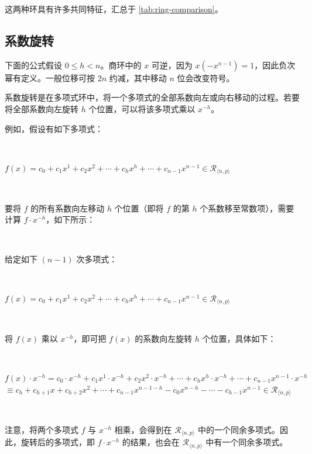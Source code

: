 这两种环具有许多共同特征，汇总于 \autoref{tab:ring-comparison}。


\subsection{系数旋转}
\label{subsec:coeff-rotation}

下面的公式假设 $0\le h<n$。商环中的 $x$ 可逆，因为 $x(-x^{n-1})=1$，因此负次幂有定义。一般位移可按 $2n$ 约减，其中移动 $n$ 位会改变符号。

系数旋转是在多项式环中，将一个多项式的全部系数向左或向右移动的过程。若要将全部系数向左旋转 $h$ 个位置，可以将该多项式乘以 $x^{-h}$。

例如，假设有如下多项式：

$ $

$f(x) = c_0 + c_1x^1 + c_2x^2 + \cdots + c_hx^h + \cdots + c_{n-1}x^{n-1} \in \mathcal{R}_{\langle n, p \rangle}$

$ $

要将 $f$ 的所有系数向左移动 $h$ 个位置（即将 $f$ 的第 $h$ 个系数移至常数项），需要计算 $f \cdot x^{-h}$，如下所示：

$ $

\begin{tcolorbox}[title={\textbf{\tboxlabel{\ref*{subsec:coeff-rotation}} 多项式旋转}}]

给定如下 $(n-1)$ 次多项式：

$ $

$f(x) = c_0 + c_1x^1 + c_2x^2 + \cdots + c_hx^h + \cdots + c_{n-1}x^{n-1} \in \mathcal{R}_{\langle n, p \rangle}$

$ $

将 $f(x)$ 乘以 $x^{-h}$，即可把 $f(x)$ 的系数向左旋转 $h$ 个位置，具体如下：

$ $

$f(x) \cdot x^{-h} = c_0\cdot x^{-h} + c_1x^1 \cdot x^{-h} + c_2x^2 \cdot x^{-h} + \cdots + c_hx^h \cdot x^{-h} + \cdots + c_{n-1}x^{n-1} \cdot x^{-h}$
$\equiv c_h + c_{h+1}x + c_{h+2}x^2 + \cdots + c_{n-1}x^{n-1-h} - c_0x^{n - h} - \cdots - c_{h-1}x^{n-1} \in \mathcal{R}_{\langle n, p \rangle}$
\end{tcolorbox}

$ $

注意，将两个多项式 $f$ 与 $x^{-h}$ 相乘，会得到在 $\mathcal{R}_{\langle n, p \rangle}$ 中的一个同余多项式。因此，旋转后的多项式，即 $f \cdot x^{-h}$ 的结果，也会在 $\mathcal{R}_{\langle n, p \rangle}$ 中有一个同余多项式。


